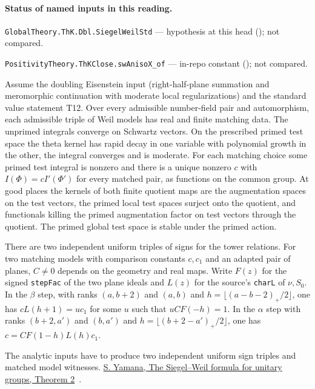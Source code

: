 

\paragraph{Status of named inputs in this reading.}
\noindent\nolinkurl{GlobalTheory.ThK.Dbl.SiegelWeilStd} --- hypothesis at this head (); not compared.\par
\noindent\nolinkurl{PositivityTheory.ThKClose.swAnisoX_of} --- in-repo constant (); not compared.\par

\begin{formalstatement}\label{sub:T11}

Assume the doubling Eisenstein input (right-half-plane summation and
meromorphic continuation with moderate local regularizations) and the
standard value statement T12. Over every admissible number-field pair and
automorphism, each admissible triple of Weil models has real and finite
matching data. The unprimed integrals converge on Schwartz vectors. On
the prescribed primed test space the theta kernel has rapid decay in one
variable with polynomial growth in the other, the integral converges and is
moderate. For each matching choice some primed test integral is nonzero
and there is a unique nonzero $c$ with $I(\Phi)=c I'(\Phi')$ for every
matched pair, as functions on the common group. At good places the kernels
of both finite quotient maps are the augmentation spaces on the test vectors,
the primed local test spaces surject onto the quotient, and functionals
killing the primed augmentation factor on test vectors through the quotient.
The primed global test space is stable under the primed action.

There are two independent uniform triples of signs for the tower relations.
For two matching models with comparison constants $c,c_1$ and an adapted
pair of planes, $C\ne0$ depends on the geometry and real maps. Write
$F(z)$ for the signed \nolinkurl{stepFac} of the two plane ideals and $L(z)$
for the source's \nolinkurl{charL} of $\nu,S_0$. In the $\beta$ step,
with ranks $(a,b+2)$ and $(a,b)$ and $h=\lfloor (a-b-2)_+/2\rfloor$,
one has $cL(h+1)=u c_1$ for some $u$ such that $uCF(-h)=1$.
In the $\alpha$ step with ranks $(b+2,a')$ and $(b,a')$ and
$h=\lfloor(b+2-a')_+/2\rfloor$, one has $c=CF(1-h)L(h)c_1$.

\end{formalstatement}

\noindent The analytic inputs have to produce two independent uniform sign triples and matched model witnesses. \href{https://msp.org/pjm/2013/264-1/pjm-v264-n1-p11-p.pdf}{S. Yamana, The Siegel–Weil formula for unitary groups, Theorem 2}~\cite{r21-yamana}.
